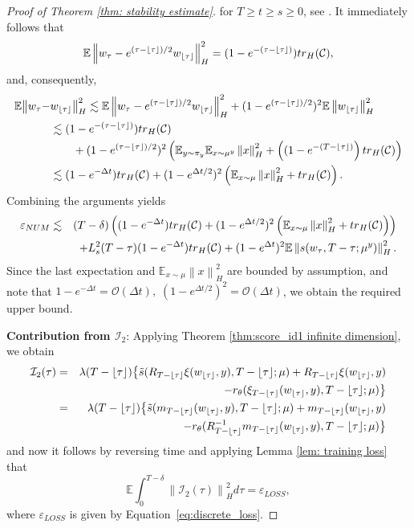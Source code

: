\documentclass[10pt]{article} %
\def\Eqref#1{Equation~\ref{#1}}
\newcommand{\E}{\mathbb{E}}
\theoremstyle{plain}
\theoremstyle{definition}
\theoremstyle{remark}
\newcommand{\tr}{{\rm tr}}
\newcommand{\norm}[1]{\left\|#1\right\|}
\newcommand{\C}{\mathcal C}
\newcommand{\low}[1]{{\lfloor #1 \rfloor}}
\begin{document}
\begin{proof}[Proof of Theorem \ref{thm: stability estimate}]
for $T \ge t \ge s \ge 0$, see \citet{FactsForInfiniteDimOU}.
It immediately follows that 
\begin{eqnarray*}
    \E \norm{w_\tau - e^{(\tau - \low{\tau}) / 2}w_{\low{\tau}}}_H^2 = (1-e^{-(\tau - \low{\tau})}) \tr_H(\C),
\end{eqnarray*}
and, consequently,
\begin{align*}
    \E \big\|w_\tau - & w_{\low\tau}\big\|_H^2 \lesssim \E \norm{w_\tau - e^{(\tau - \low{\tau}) / 2}w_{\low\tau}}_H^2 + (1-e^{(\tau - \low{\tau}) / 2})^2 \E \norm{w_{\low\tau}}_H^2 \\
    & \lesssim  (1-e^{-(\tau - \low{\tau})}) \tr_H(\C) \\
    & \quad\quad + (1-e^{(\tau - \low{\tau}) / 2})^2 \left(\E_{y\sim\pi_y}\E_{x\sim \mu^y} \norm{x}_H^2 + \left((1-e^{-(T-\low{\tau})}\right) \tr_H(\C)\right) \\
    & \lesssim (1-e^{-\Delta t}) \tr_H(\C)
    +(1-e^{\Delta t/ 2})^2 \left(\E_{x\sim\mu} \norm{x}^2_H + \tr_H (\C)\right).
\end{align*}
Combining the arguments yields
\begin{eqnarray*}
    \varepsilon_{NUM} & \lesssim &
    (T-\delta) \left((1-e^{-\Delta t}) \tr_H(\C)
    +(1-e^{\Delta t/ 2})^2 \left(\E_{x\sim\mu} \norm{x}^2_H + \tr_H (\C)\right)\right) \\
    & & + L_s^2(T-\tau) (1-e^{-\Delta t}) \tr_H(\C) 
    + (1-e^{\Delta t})^2 \E \norm{s(w_\tau, T - \tau; \mu^y)}_H^2.
\end{eqnarray*}
Since the last expectation and $\E_{x\sim\mu} \norm{x}_H^2$ are bounded by assumption, and note that $1-e^{-\Delta t} = {\mathcal O}(\Delta t),\; (1-e^{\Delta t/ 2})^2 = {\mathcal O}(\Delta t)$, we obtain the required upper bound.


{\bf Contribution from ${\mathcal I_2}$}: Applying Theorem \ref{thm:score_id1 infinite dimension}, we obtain
\begin{eqnarray*}
	{\mathcal I_2}(\tau) & = & \lambda(T-\low \tau)\big\{\Tilde{s}(R_{T-\low \tau} \xi(w_{\low\tau},y), T-\low \tau; \mu) + R_{T-\low \tau} \xi(w_{\low\tau},y)  \\
	& & \quad - r_\theta(\xi_{T-\low\tau}(w_{\low\tau}, y), T - \low \tau; \mu) \big\} \\
	& = & \lambda(T-\low \tau)\big\{\Tilde{s}(m_{T-\low \tau} (w_{\low\tau},y), T-\low \tau; \mu)  + m_{T-\low \tau} (w_{\low\tau},y) \\
	& &   - r_\theta(R_{T-\low \tau}^{-1} m_{T-\low \tau}(w_{\low\tau}, y), T - \low \tau; \mu) \big\}
\end{eqnarray*}
and now it follows by reversing time and applying Lemma \ref{lem: training loss} that
\begin{equation*}
	\E \int_0^{T-\delta} \norm{{\mathcal I}_2(\tau)}_H^2 d\tau = \varepsilon_{LOSS},
\end{equation*}
where $\varepsilon_{LOSS}$ is given by \Eqref{eq:discrete_loss}.


\end{proof}
\end{document}
